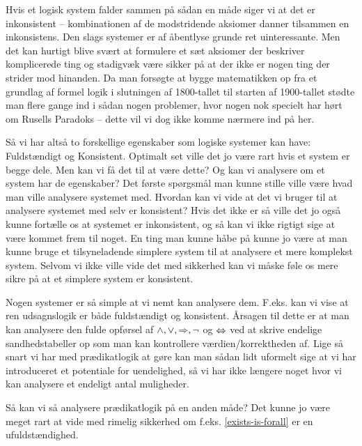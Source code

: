 Hvis et logisk system falder sammen på sådan en måde siger vi at det er inkonsistent --
kombinationen af de modstridende aksiomer danner tilsammen en inkonsistens.
Den slags systemer er af åbentlyse grunde ret uinteressante.
Men det kan hurtigt blive svært at formulere et sæt aksiomer der beskriver komplicerede ting
og stadigvæk være sikker på at der ikke er nogen ting der strider mod hinanden.
Da man forsøgte at bygge matematikken op fra et grundlag af formel logik i slutningen
af 1800-tallet til starten af 1900-tallet stødte man flere gange ind i sådan nogen problemer,
hvor nogen nok specielt har hørt om Rusells Paradoks -- dette vil vi dog ikke komme nærmere
ind på her.

Så vi har altså to forskellige egenskaber som logiske systemer kan have: Fuldstændigt og Konsistent.
Optimalt set ville det jo være rart hvis et system er begge dele.
Men kan vi få det til at være dette? Og kan vi analysere om et system har de egenskaber?
Det første spørgsmål man kunne stille ville være hvad man ville analysere systemet med. Hvordan kan vi vide at det
vi bruger til at analysere systemet med selv er konsistent? Hvis det ikke er så ville det jo også kunne fortælle
os at systemet er inkonsistent, og så kan vi ikke rigtigt sige at være kommet frem til noget.
En ting man kunne håbe på kunne jo være at man kunne bruge et tilsyneladende simplere system til at analysere et mere komplekst system.
Selvom vi ikke ville vide det med sikkerhed kan vi måske føle os mere sikre på at et simplere system er konsistent.

Nogen systemer er så simple at vi nemt kan analysere dem. F.eks. kan vi vise at ren udsagnslogik er både fuldstændigt og konsistent.
Årsagen til dette er at man kan analysere den fulde opførsel af $\land,\lor,\Rightarrow,\neg$ og $\Leftrightarrow$ ved at skrive endelige sandhedstabeller op som man
kan kontrollere værdien/korrektheden af. Lige så snart vi har med prædikatlogik at gøre kan man sådan lidt uformelt sige at vi
har introduceret et potentiale for uendelighed, så vi har ikke længere noget hvor vi kan analysere et endeligt antal muligheder.

Så kan vi så analysere prædikatlogik på en anden måde? Det kunne jo være meget rart at vide med rimelig sikkerhed om 
f.eks. \eqref{exists-is-forall} er en ufuldstændighed.

\ifdefined\startGoedel\fi
